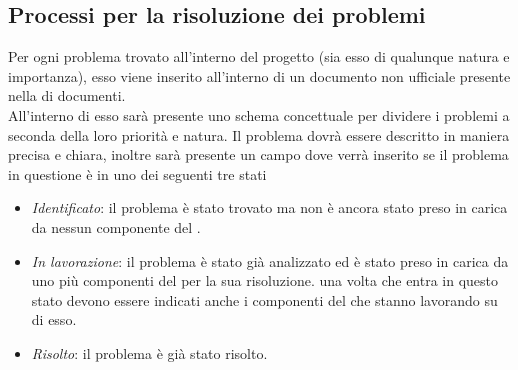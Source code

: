 \subsection{Processi per la risoluzione dei problemi}
Per ogni problema trovato all'interno del progetto (sia esso di qualunque natura e importanza), esso viene inserito all'interno di un documento non ufficiale presente nella  di documenti. \\
All'interno di esso sarà presente uno schema concettuale per dividere i problemi a seconda della loro priorità e natura. Il problema dovrà essere descritto in maniera precisa e chiara, inoltre sarà presente un campo dove verrà inserito se il problema in questione è in uno dei seguenti tre stati
\begin{itemize}
	\item \textit{Identificato}: il problema è stato trovato ma non è ancora stato preso in carica da nessun componente del .
	\item\textit{In lavorazione}: il problema è stato già analizzato ed è stato preso in carica da uno più componenti del  per la sua risoluzione. una volta che entra in questo stato devono essere indicati anche i componenti del  che stanno lavorando su di esso.
	\item \textit{Risolto}: il problema è già stato risolto.
\end{itemize}

\newpage